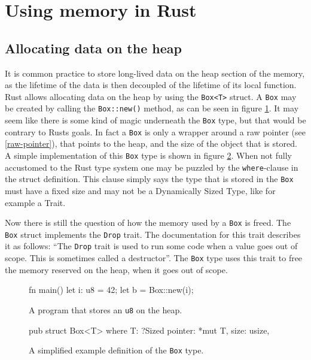 \documentclass[twocolumn]{article}
\begin{document}
\section{Using memory in Rust}
\subsection{Allocating data on the heap}
\label{box}
It is common practice to store long-lived data on the heap section of the memory, as the lifetime of the data is then decoupled of the lifetime of its local function.
Rust allows allocating data on the heap by using the \texttt{Box<T>} struct.
A \texttt{Box} may be created by calling the \texttt{Box::new()} method, as can be seen in figure \ref{box-example}.
It may seem like there is some kind of magic underneath the \texttt{Box} type, but that would be contrary to Rusts goals.
In fact a \texttt{Box} is only a wrapper around a raw pointer (see \ref{raw-pointer}), that points to the heap, and the size of the object that is stored.
A simple implementation of this \texttt{Box} type is shown in figure \ref{box-definition}.
When not fully accustomed to the Rust type system one may be puzzled by the \texttt{where}-clause in the struct definition.
This clause simply says the type that is stored in the \texttt{Box} must have a fixed size and may not be a Dynamically Sized Type\cite{BlogDST}, like for example a Trait.

Now there is still the question of how the memory used by a \texttt{Box} is freed.
The \texttt{Box} struct implements the \texttt{Drop} trait.
The documentation for this trait describes it as follows: ``The \texttt{Drop} trait is used to run some code when a value goes out of scope. This is sometimes called a destructor''\cite{RustDoc-Drop}.
The \texttt{Box} type uses this trait to free the memory reserved on the heap, when it goes out of scope.


\begin{figure}
\begin{rustcode}
fn main() {
    let i: u8 = 42;
    let b = Box::new(i);
}
\end{rustcode}
\vspace{-2em}
\caption{A program that stores an \texttt{u8} on the heap.}
\label{box-example}
\end{figure}
\begin{figure}
\begin{rustcode}
pub struct Box<T> where T: ?Sized {
    pointer: *mut T,
    size: usize,
}
\end{rustcode}
\vspace{-2em}
\caption{A simplified example definition of the \texttt{Box} type.}
\label{box-definition}
\end{figure}
\end{document}
